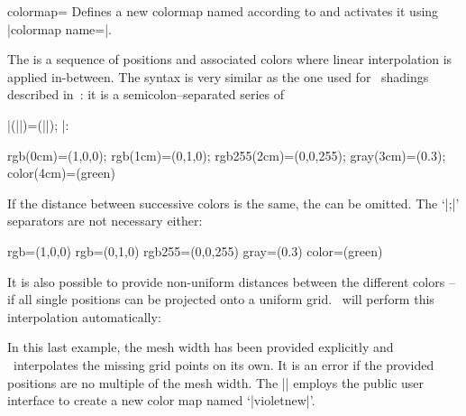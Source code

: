 \begin{pgfplotskey}{colormap=}
	Defines a new colormap named  according to  and activates it using |colormap name=|.
	
	The  is a sequence of positions and associated colors where linear interpolation is applied in-between. The syntax is very similar as the one used for \PGF\ shadings described in~\cite[VIII -- Shadings]{tikz}: it is a semicolon--separated series of 
	
	|(||)=(||); |:
	
\begin{codeexample}
rgb(0cm)=(1,0,0); rgb(1cm)=(0,1,0); rgb255(2cm)=(0,0,255); gray(3cm)=(0.3);  color(4cm)=(green)
\end{codeexample}

	If the distance between successive colors is the same, the   can be omitted. The `|;|' separators are not necessary either:

\begin{codeexample}
rgb=(1,0,0) rgb=(0,1,0) rgb255=(0,0,255) gray=(0.3) color=(green)
\end{codeexample}

	It is also possible to provide non-uniform distances between the different colors -- if all single positions can be projected onto a uniform grid. \PGFPlots\ will perform this interpolation automatically:

\begin{codeexample}[code only]
\end{codeexample}

\noindent In this last example, the mesh width has been provided explicitly and \PGFPlots\ interpolates the missing grid points on its own. It is an error if the provided positions are no multiple of the mesh width. The |\pgfplotsset| employs the public user interface to create a new color map named `|violetnew|'.


\end{pgfplotskey}
